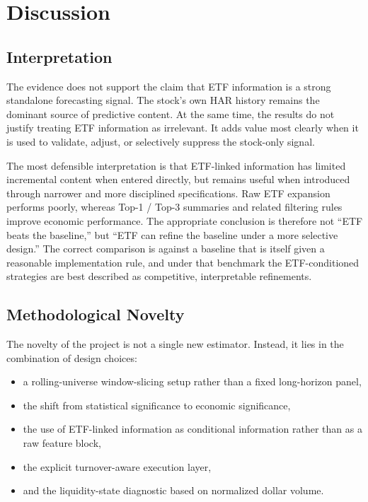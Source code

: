 \section{Discussion}
\label{sec:discussion}

\subsection{Interpretation}

The evidence does not support the claim that ETF information is a strong standalone forecasting signal. The stock's own HAR history remains the dominant source of predictive content. At the same time, the results do not justify treating ETF information as irrelevant. It adds value most clearly when it is used to validate, adjust, or selectively suppress the stock-only signal.

The most defensible interpretation is that ETF-linked information has limited incremental content when entered directly, but remains useful when introduced through narrower and more disciplined specifications. Raw ETF expansion performs poorly, whereas Top-1 / Top-3 summaries and related filtering rules improve economic performance. The appropriate conclusion is therefore not ``ETF beats the baseline,'' but ``ETF can refine the baseline under a more selective design.'' The correct comparison is against a baseline that is itself given a reasonable implementation rule, and under that benchmark the ETF-conditioned strategies are best described as competitive, interpretable refinements.

\subsection{Methodological Novelty}

The novelty of the project is not a single new estimator. Instead, it lies in the combination of design choices:
\begin{itemize}[leftmargin=1.4em]
  \item a rolling-universe window-slicing setup rather than a fixed long-horizon panel,
  \item the shift from statistical significance to economic significance,
  \item the use of ETF-linked information as conditional information rather than as a raw feature block,
  \item the explicit turnover-aware execution layer,
  \item and the liquidity-state diagnostic based on normalized dollar volume.
\end{itemize}

